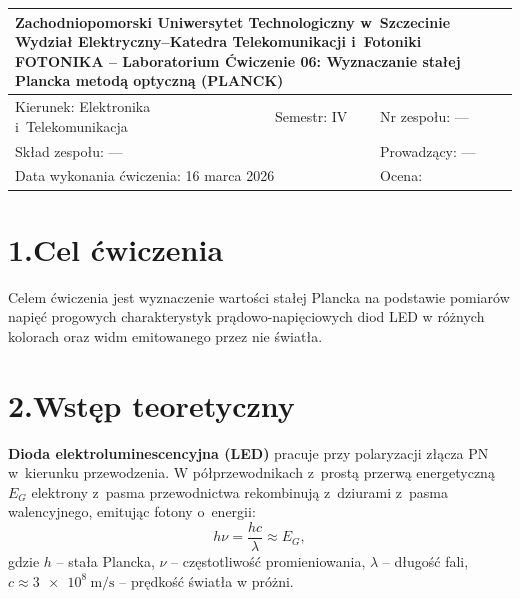 \documentclass[a4paper,12pt]{article}
\title{}
\date{}
\begin{document}
\begin{table}[H]
\centering
\renewcommand{\arraystretch}{1.4}
\begin{tabular}{|p{4.2cm}|p{4.2cm}|p{4.2cm}|}
\hline
\multicolumn{3}{|p{12.9cm}|}{%
  \centering
  \textbf{Zachodniopomorski Uniwersytet Technologiczny w~Szczecinie}
  \newline
  Wydział Elektryczny\quad--\quad Katedra Telekomunikacji i~Fotoniki
  \newline
  \textbf{FOTONIKA -- Laboratorium}
  \newline
  \textbf{Ćwiczenie 06: Wyznaczanie stałej Plancka metodą optyczną (PLANCK)}
} \\
\hline
Kierunek: Elektronika i~Telekomunikacja &
  Semestr: IV & Nr zespołu: --- \\
\hline
\multicolumn{2}{|l|}{Skład zespołu: ---} &
  Prowadzący: --- \\
\hline
\multicolumn{2}{|l|}{Data wykonania ćwiczenia: 16 marca 2026} &
  Ocena: \phantom{XXXXX} \\
\hline
\end{tabular}
\end{table}

\section*{1.\quad Cel ćwiczenia}

Celem ćwiczenia jest wyznaczenie wartości stałej Plancka na podstawie pomiarów napięć
progowych charakterystyk prądowo-napięciowych diod LED w różnych kolorach oraz widm
emitowanego przez nie światła.

\section*{2.\quad Wstęp teoretyczny}

\textbf{Dioda elektroluminescencyjna (LED)} pracuje przy polaryzacji złącza PN w~kierunku
przewodzenia. W półprzewodnikach z~prostą przerwą energetyczną $E_G$ elektrony z~pasma
przewodnictwa rekombinują z~dziurami z~pasma walencyjnego, emitując fotony o~energii:
\begin{equation}
  h\nu = \frac{hc}{\lambda} \approx E_G,
  \label{eq:foton}
\end{equation}
gdzie $h$ – stała Plancka, $\nu$ – częstotliwość promieniowania, $\lambda$ – długość fali,
$c \approx \SI{3e8}{\metre\per\second}$ – prędkość światła w próżni.
\end{document}
